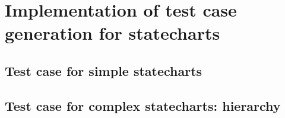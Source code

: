 \section{Implementation of test case generation for statecharts}
\label{implementTestGen}



\subsection{Test case for simple statecharts}
\label{testSimpeState}


\subsection{Test case for complex statecharts: hierarchy}
\label{testHierarchy}


